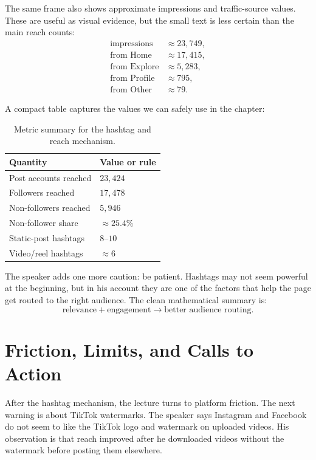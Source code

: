 The same frame also shows approximate impressions and traffic-source values. These are useful as visual evidence, but the small text is less certain than the main reach counts:
\begin{align}
\text{impressions} &\approx 23{,}749,\\
\text{from Home} &\approx 17{,}415,\\
\text{from Explore} &\approx 5{,}283,\\
\text{from Profile} &\approx 795,\\
\text{from Other} &\approx 79.
\end{align}

A compact table captures the values we can safely use in the chapter:
\begin{table}
\centering
\begin{tabular}{ll}
\hline
Quantity & Value or rule \\
\hline
Post accounts reached & $23{,}424$ \\
Followers reached & $17{,}478$ \\
Non-followers reached & $5{,}946$ \\
Non-follower share & $\approx 25.4\%$ \\
Static-post hashtags & $8\text{--}10$ \\
Video/reel hashtags & $\approx 6$ \\
\hline
\end{tabular}
\caption{Metric summary for the hashtag and reach mechanism.}
\end{table}

The speaker adds one more caution: be patient. Hashtags may not seem powerful at the beginning, but in his account they are one of the factors that help the page get routed to the right audience. The clean mathematical summary is:
\begin{equation}
\text{relevance} + \text{engagement}
\longrightarrow
\text{better audience routing}.
\end{equation}

\section{Friction, Limits, and Calls to Action}

After the hashtag mechanism, the lecture turns to platform friction. The next warning is about TikTok watermarks. The speaker says Instagram and Facebook do not seem to like the TikTok logo and watermark on uploaded videos. His observation is that reach improved after he downloaded videos without the watermark before posting them elsewhere.

